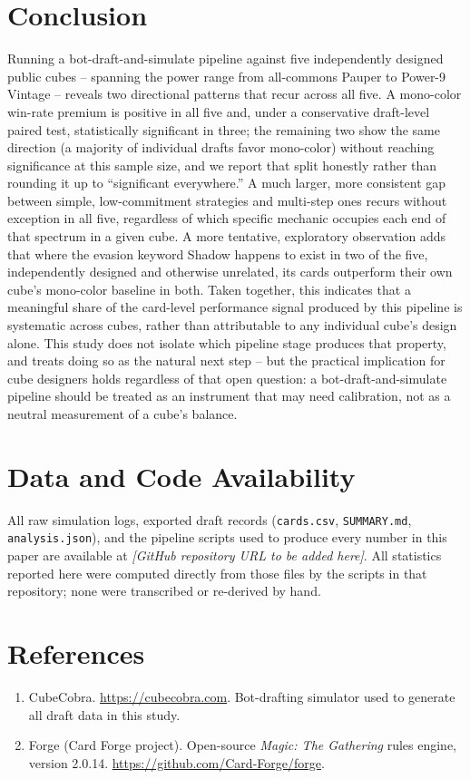 \documentclass[11pt]{article}
\begin{document}
\section{Conclusion}

Running a bot-draft-and-simulate pipeline against five independently designed
public cubes -- spanning the power range from all-commons Pauper to Power-9
Vintage -- reveals two directional patterns that recur across all five. A mono-color
win-rate premium is positive in all five and, under a conservative draft-level
paired test, statistically significant in three; the remaining two show the same
direction (a majority of individual drafts favor mono-color) without reaching
significance at this sample size, and we report that split honestly rather than
rounding it up to ``significant everywhere.'' A much larger, more consistent gap
between simple, low-commitment strategies and multi-step ones recurs without
exception in all five, regardless of which specific mechanic occupies each end of
that spectrum in a given cube. A more tentative, exploratory observation adds
that where the evasion keyword Shadow happens to exist in two of the five,
independently designed and otherwise unrelated, its cards outperform their own
cube's mono-color baseline in both. Taken together, this indicates that a
meaningful share of the card-level performance signal produced by this
pipeline is systematic across cubes, rather than attributable to any
individual cube's design alone. This study does not
isolate which pipeline stage produces that property, and treats doing so as the
natural next step -- but the practical implication for cube designers holds
regardless of that open question: a bot-draft-and-simulate pipeline should be
treated as an instrument that may need calibration, not as a neutral measurement
of a cube's balance.

\section*{Data and Code Availability}
All raw simulation logs, exported draft records (\texttt{cards.csv},
\texttt{SUMMARY.md}, \texttt{analysis.json}), and the pipeline scripts used to
produce every number in this paper are available at
\textit{[GitHub repository URL to be added here]}. All statistics reported here
were computed directly from those files by the scripts in that repository; none
were transcribed or re-derived by hand.

\section*{References}
\begin{enumerate}
\item CubeCobra. \url{https://cubecobra.com}. Bot-drafting simulator used to
generate all draft data in this study.
\item Forge (Card Forge project). Open-source \emph{Magic: The Gathering} rules
engine, version 2.0.14. \url{https://github.com/Card-Forge/forge}.
\end{enumerate}
\end{document}
